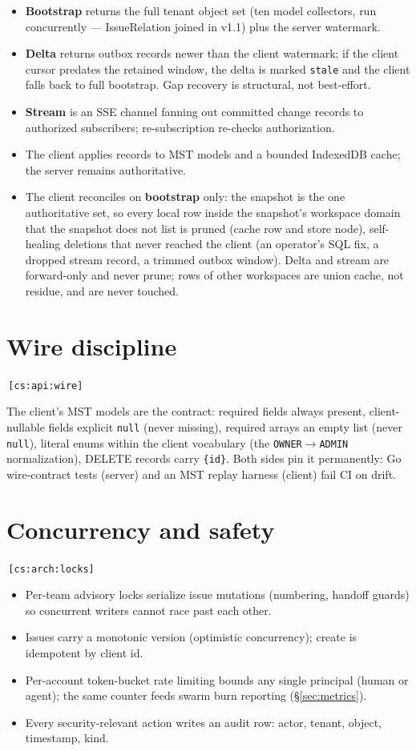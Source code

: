 \documentclass[11pt,a4paper]{report}
\newcommand{\cs}[1]{\,\texttt{\scriptsize[cs:#1]}\label{cs:#1}}
\begin{document}
\begin{itemize}
\item \textbf{Bootstrap} returns the full tenant object set (ten model
  collectors, run concurrently --- IssueRelation joined in v1.1) plus the
  server watermark.
\item \textbf{Delta} returns outbox records newer than the client
  watermark; if the client cursor predates the retained window, the delta
  is marked \texttt{stale} and the client falls back to full bootstrap.
  Gap recovery is structural, not best-effort.
\item \textbf{Stream} is an SSE channel fanning out committed change
  records to authorized subscribers; re-subscription re-checks
  authorization.
\item The client applies records to MST models and a bounded IndexedDB
  cache; the server remains authoritative.
\item The client reconciles on \textbf{bootstrap} only: the snapshot is
  the one authoritative set, so every local row inside the snapshot's
  workspace domain that the snapshot does not list is pruned (cache row
  and store node), self-healing deletions that never reached the client
  (an operator's SQL fix, a dropped stream record, a trimmed outbox
  window). Delta and stream are forward-only and never prune; rows of
  other workspaces are union cache, not residue, and are never touched.
\end{itemize}

\section{Wire discipline}
\cs{api:wire}

The client's MST models are the contract: required fields always present,
client-nullable fields explicit \texttt{null} (never missing), required
arrays an empty list (never \texttt{null}), literal enums within the client
vocabulary (the \texttt{OWNER$\to$ADMIN} normalization), DELETE records
carry \texttt{\{id\}}. Both sides pin it permanently: Go wire-contract
tests (server) and an MST replay harness (client) fail CI on drift.

\section{Concurrency and safety}
\cs{arch:locks}

\begin{itemize}
\item Per-team advisory locks serialize issue mutations (numbering,
  handoff guards) so concurrent writers cannot race past each other.
\item Issues carry a monotonic version (optimistic concurrency);
  create is idempotent by client id.
\item Per-account token-bucket rate limiting bounds any single principal
  (human or agent); the same counter feeds swarm burn reporting
  (\S\ref{sec:metrics}).
\item Every security-relevant action writes an audit row: actor, tenant,
  object, timestamp, kind.
\end{itemize}
\end{document}
